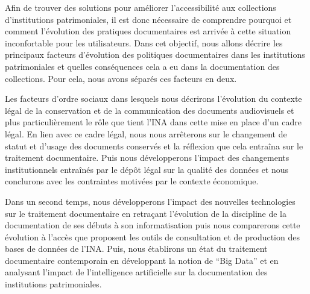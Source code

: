 Afin de trouver des solutions pour améliorer l'accessibilité aux collections d'institutions patrimoniales, il est donc nécessaire de comprendre pourquoi et comment l'évolution des pratiques documentaires est arrivée à cette situation inconfortable pour les utilisateurs. Dans cet objectif, nous allons décrire les principaux facteurs d'évolution des politiques documentaires dans les institutions patrimoniales et quelles conséquences cela a eu dans la documentation des collections. Pour cela, nous avons séparés ces facteurs en deux. 


Les facteurs d'ordre sociaux dans lesquels nous décrirons l'évolution du contexte légal de la conservation et de la communication des documents audiovisuels et plus particulièrement le rôle que tient l'INA dans cette mise en place d'un cadre légal. En lien avec ce cadre légal, nous nous arrêterons sur le changement de statut et d'usage des documents conservés et la réflexion que cela entraîna sur le traitement documentaire. Puis nous développerons l'impact des changements institutionnels entraînés par le dépôt légal sur la qualité des données et nous conclurons avec les contraintes motivées par le contexte économique. 


Dans un second temps, nous développerons l'impact des nouvelles technologies sur le traitement documentaire en retraçant l'évolution de la discipline de la documentation de ses débuts à son informatisation puis nous comparerons cette évolution à l'accès que proposent les outils de consultation et de production des bases de données de l'INA. Puis, nous établirons un état du traitement documentaire contemporain en développant la notion de \enquote{Big Data} et en analysant l'impact de l'intelligence artificielle sur la documentation des institutions patrimoniales. 